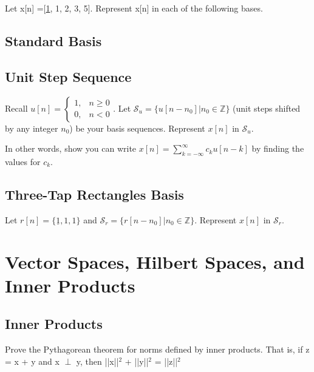 \documentclass[11pt]{article}
\begin{document}
Let x[n] =[\underline{1}, 1, 2, 3, 5]. Represent x[n] in each of the following bases.

\vspace{5mm}

\subsection{Standard Basis}

\vspace{1.5mm}

\subsection{Unit Step Sequence}
Recall $u[n] = \begin{cases}1, & n \geq 0\\ 0, & n < 0 \end{cases}$. Let $\mathcal{S}_u = \{u[n-n_0]|n_0 \in \mathbb{Z}\}$ (unit steps shifted by any integer $n_0$) be your basis sequences. Represent $x[n]$ in $\mathcal{S}_u$.

In other words, show you can write $x[n]=\sum\limits_{k=-\infty}^\infty c_k u[n-k]$ by finding the values for $c_k$.

\vspace{1.5mm}

\subsection{Three-Tap Rectangles Basis}
Let $r[n] = \{\underline{1},1,1\}$ and $\mathcal{S}_r = \{r[n-n_0]|n_0 \in \mathbb{Z}\}$. Represent $x[n]$ in $\mathcal{S}_r$.

\vspace{1.5mm}


\section{Vector Spaces, Hilbert Spaces, and Inner Products}

\subsection{Inner Products}
Prove the Pythagorean theorem for norms defined by inner products. That is, if z = x + y and \newline
x $\perp$ y, then ||x||$^2$ + ||y||$^2$ = ||z||$^2$
\end{document}
